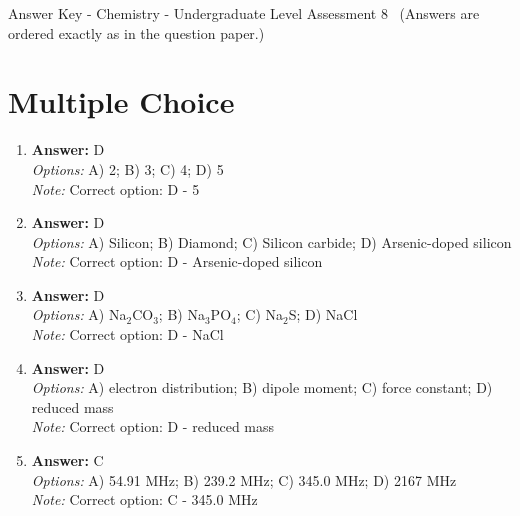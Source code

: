 \documentclass[12pt]{article}
\begin{document}
\begin{center}
Answer Key - Chemistry - Undergraduate Level Assessment 8 \
\small (Answers are ordered exactly as in the question paper.)
\end{center}

\section*{Multiple Choice}
\begin{enumerate}[label=\arabic*.]
\item \textbf{Answer:} D
\\ \textit{Options:} A) 2; B) 3; C) 4; D) 5
\\ \textit{Note:} Correct option: D - 5
\item \textbf{Answer:} D
\\ \textit{Options:} A) Silicon; B) Diamond; C) Silicon carbide; D) Arsenic-doped silicon
\\ \textit{Note:} Correct option: D - Arsenic-doped silicon
\item \textbf{Answer:} D
\\ \textit{Options:} A) Na$_{2}$CO$_{3}$; B) Na$_{3}$PO$_{4}$; C) Na$_{2}$S; D) NaCl
\\ \textit{Note:} Correct option: D - NaCl
\item \textbf{Answer:} D
\\ \textit{Options:} A) electron distribution; B) dipole moment; C) force constant; D) reduced mass
\\ \textit{Note:} Correct option: D - reduced mass
\item \textbf{Answer:} C
\\ \textit{Options:} A) 54.91 MHz; B) 239.2 MHz; C) 345.0 MHz; D) 2167 MHz
\\ \textit{Note:} Correct option: C - 345.0 MHz
\end{enumerate}
\end{document}
